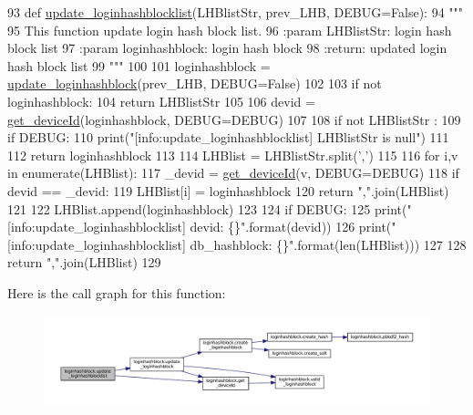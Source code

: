 \begin{DoxyCode}
93 \textcolor{keyword}{def }\hyperlink{namespaceloginhashblock_a7baa4021b9f57044f8227c2e0320ee2b}{update\_loginhashblocklist}(LHBlistStr, prev\_LHB, DEBUG=False):
94     \textcolor{stringliteral}{"""}
95 \textcolor{stringliteral}{    This function update login hash block list.}
96 \textcolor{stringliteral}{    :param LHBlistStr: login hash block list}
97 \textcolor{stringliteral}{    :param loginhashblock: login hash block}
98 \textcolor{stringliteral}{    :return: updated login hash block list}
99 \textcolor{stringliteral}{    """}
100 
101     loginhashblock = \hyperlink{namespaceloginhashblock_ab6bafe3dab103cc698822367e53d4a64}{update\_loginhashblock}(prev\_LHB, DEBUG=\textcolor{keyword}{False})
102 
103     \textcolor{keywordflow}{if} \textcolor{keywordflow}{not} loginhashblock:
104         \textcolor{keywordflow}{return} LHBlistStr
105 
106     devid = \hyperlink{namespaceloginhashblock_a1908d7c90a7ea1a7f84eeac3a1378b57}{get\_deviceId}(loginhashblock, DEBUG=DEBUG)
107 
108     \textcolor{keywordflow}{if} \textcolor{keywordflow}{not} LHBlistStr :
109         \textcolor{keywordflow}{if} DEBUG:
110             print(\textcolor{stringliteral}{"[info:update\_loginhashblocklist] LHBlistStr is null"})
111 
112         \textcolor{keywordflow}{return} loginhashblock
113 
114     LHBlist = LHBlistStr.split(\textcolor{stringliteral}{','})
115 
116     \textcolor{keywordflow}{for} i,v \textcolor{keywordflow}{in} enumerate(LHBlist):
117         \_devid = \hyperlink{namespaceloginhashblock_a1908d7c90a7ea1a7f84eeac3a1378b57}{get\_deviceId}(v, DEBUG=DEBUG)
118         \textcolor{keywordflow}{if} devid == \_devid:
119             LHBlist[i] = loginhashblock
120             \textcolor{keywordflow}{return} \textcolor{stringliteral}{","}.join(LHBlist)
121 
122     LHBlist.append(loginhashblock)
123 
124     \textcolor{keywordflow}{if} DEBUG:
125         print(\textcolor{stringliteral}{"[info:update\_loginhashblocklist] devid: \{\}"}.format(devid))
126         print(\textcolor{stringliteral}{"[info:update\_loginhashblocklist] db\_hashblock: \{\}"}.format(len(LHBlist)))
127 
128     \textcolor{keywordflow}{return} \textcolor{stringliteral}{","}.join(LHBlist)
129 
\end{DoxyCode}


Here is the call graph for this function\+:\nopagebreak
\begin{figure}[H]
\begin{center}
\leavevmode
\includegraphics[width=350pt]{namespaceloginhashblock_a7baa4021b9f57044f8227c2e0320ee2b_cgraph}
\end{center}
\end{figure}




